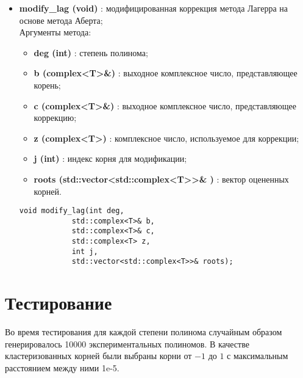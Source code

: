 \documentclass[a4paper,12pt]{article}
\begin{document}
\begin{itemize}
    \item \textbf{modify\_lag (void)} : модифицированная коррекция метода Лагерра на основе метода Аберта;
    \\Аргументы метода:
    \begin{itemize}
        \renewcommand{\labelitemi}{-}
        \item \textbf{deg (int)} : степень полинома;
        \item \textbf{b (complex<T>\&)} : выходное комплексное число, представляющее корень;
        \item \textbf{c (complex<T>\&)} : выходное комплексное число, представляющее коррекцию;
        \item \textbf{z (complex<T>)} : комплексное число, используемое для коррекции;
        \item \textbf{j (int)} : индекс корня для модификации;
        \item \textbf{roots (std::vector<std::complex<T>>\& )} : вектор оцененных корней.
    \end{itemize}
\begin{lstlisting}[language=С++]
void modify_lag(int deg, 
            std::complex<T>& b, 
            std::complex<T>& c, 
            std::complex<T> z, 
            int j, 
            std::vector<std::complex<T>>& roots); \end{lstlisting}
    
\end{itemize}

\newpage
\section{Тестирование}
Во время тестирования для каждой степени полинома случайным образом генерировалось 10000 экспериментальных полиномов. В качестве кластеризованных корней были выбраны корни от $-1$ до $1$ с максимальным расстоянием между ними 1e-5.
\end{document}
